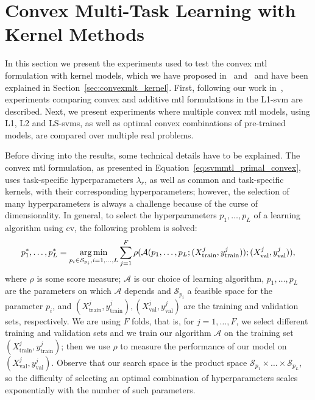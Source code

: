 \section{Convex Multi-Task Learning with Kernel Methods}\label{sec:convexmtlsvm_exp}
In this section we present the experiments used to test the convex \acrshort{mtl} formulation with kernel models, which we have proposed in~\citep{RuizAD19} and~\citep{RuizAD21} and have been explained in Section~\ref{sec:convexmlt_kernel}. 
%
First, following our work in~\citep{RuizAD19}, experiments comparing convex and additive \acrshort{mtl} formulations in the L1-\acrshort{svm} are described. 
%
Next, we present experiments where multiple convex \acrshort{mtl} models, using L1, L2 and LS-\acrshort{svms}, as well as optimal convex combinations of pre-trained models, are compared over multiple real problems.
%

Before diving into the results, some technical details have to be explained. The convex \acrshort{mtl} formulation, as presented in Equation~\eqref{eq:svmmtl_primal_convex}, uses task-specific hyperparameters $\lambda_r$, as well as common and task-specific kernels, with their corresponding hyperparameters; however, the selection of many hyperparameters is always a challenge because of the curse of dimensionality. 
%
In general, to select the hyperparameters $p_1, \ldots, p_L$ of a learning algorithm using \acrshort{cv}, the following problem is solved:
\begin{equation}
    \label{eq:hp-selection_general}
    p_1^*, \ldots, p_L^* = \argmin_{p_i \in \mathcal{S}_{p_i}, i=1, \ldots, L} \sum_{j=1}^{F} \rho(\mathcal{A}(p_1, \ldots, p_L; (X^j_\text{train}, y^j_\text{train})); (X^j_\text{val}, y^j_\text{val})) ,
\end{equation}
where $\rho$ is some score measure; $\mathcal{A}$ is our choice of learning algorithm, $p_1, \ldots, p_L$ are the parameters on which $\mathcal{A}$ depends and $\mathcal{S}_{p_i}$ a feasible space for the parameter $p_i$, and $(X^j_\text{train}, y^j_\text{train}), (X^j_\text{val}, y^j_\text{val})$ are the training and validation sets, respectively. We are using $F$ folds, that is, for $j=1, \ldots, F$, we select different training and validation sets and we train our algorithm $\mathcal{A}$ on the training set $(X^j_\text{train}, y^j_\text{train})$; then we use $\rho$ to measure the performance of our model on $(X^j_\text{val}, y^j_\text{val})$. 
%
Observe that our search space is the product space $\mathcal{S}_{p_1} \times \ldots \times \mathcal{S}_{p_L}$, so the difficulty of selecting an optimal combination of hyperparameters scales exponentially with the number of such parameters.


